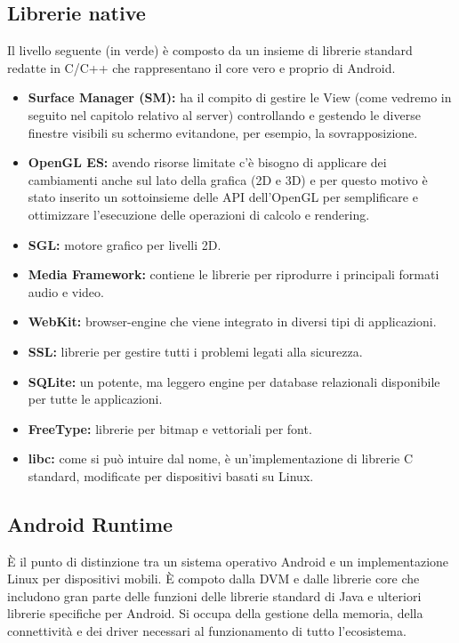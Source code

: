 \subsection{Librerie native}
Il livello seguente (in verde) è composto da un insieme di librerie standard redatte in C/C++ che rappresentano il core vero e proprio di Android.
\begin{itemize}
\item \textbf{Surface Manager (SM):}  ha il compito di gestire le View (come vedremo in seguito nel capitolo relativo al server) controllando e gestendo le diverse finestre visibili su schermo evitandone, per esempio, la sovrapposizione.
\item \textbf{OpenGL ES:} avendo risorse limitate c'è bisogno di applicare dei cambiamenti anche sul lato della grafica (2D e 3D) e per questo motivo è stato inserito un sottoinsieme delle API dell'OpenGL per semplificare e ottimizzare l'esecuzione delle operazioni di calcolo e rendering.
\item \textbf{SGL:} motore grafico per livelli 2D.
\item \textbf{Media Framework:} contiene le librerie per riprodurre i principali formati audio e video.
\item \textbf{WebKit:} browser-engine che viene integrato in diversi tipi di applicazioni.
\item \textbf{SSL:} librerie per gestire tutti i problemi legati alla sicurezza.
\item \textbf{SQLite:} un potente, ma leggero engine per database relazionali disponibile per tutte le applicazioni.
\item \textbf{FreeType:} librerie per bitmap e vettoriali per font.
\item \textbf{libc:} come si può intuire dal nome, è un'implementazione di librerie C standard, modificate per dispositivi basati su Linux.
\end{itemize}

\subsection{Android Runtime}
È il punto di distinzione tra un sistema operativo Android e un implementazione Linux per dispositivi mobili. È compoto dalla DVM e dalle librerie core che includono gran parte delle funzioni delle librerie standard di Java e ulteriori librerie specifiche per Android. Si occupa della gestione della memoria, della connettività e dei driver necessari al funzionamento di tutto l'ecosistema.

